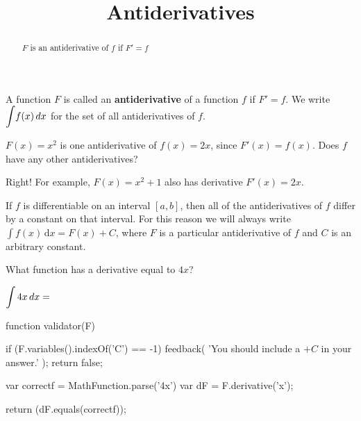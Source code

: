 \documentclass{ximera}
\title{Antiderivatives}
\begin{document}
\begin{abstract}
  $F$ is an antiderivative of $f$ if $F'=f$
\end{abstract}

\maketitle

\begin{definition}
  A function $F$ is called an \textbf{antiderivative} of a function
  $f$ if $F' = f$.  We write $\displaystyle \int \!  f(x) \,d x$ for the set of all antiderivatives of $f$.
\end{definition}

\begin{question}
  $F(x) = x^2$ is one antiderivative of $f(x) = 2x$, since $F'(x) =
  f(x)$.  Does $f$ have any other antiderivatives?
\begin{solution}
	 \begin{multipleChoice}
    	\end{multipleChoice}  
\end{solution}
  
Right!  For example, $F(x) = x^2+1$ also has derivative $F'(x) = 2x$.
\end{question}

\begin{theorem}
	If $f$ is differentiable on an interval $[a,b]$, then all of the antiderivatives of $f$ differ by a constant on that interval.  For this reason we will always write $\displaystyle \int \! f(x) \, \mathrm{d}x  = F(x)+C$, where $F$ is a particular antiderivative of $f$ and $C$ is an arbitrary constant.
\end{theorem}

\begin{question}
	\begin{hint}
		What function has a derivative equal to $4x$?
	\end{hint}
 	$\displaystyle \int 4x \,d x = $ 
	\begin{expression-answer}
 function validator(F) {
   if (F.variables().indexOf('C') == -1) {
     feedback( 'You should include a $+C$ in your answer.' );
     return false;
   }
   
   var correctf = MathFunction.parse('4x')
   var dF = F.derivative('x');
   
   return (dF.equals(correctf));
 }
\end{expression-answer}	
	
\end{question}
\end{document}
